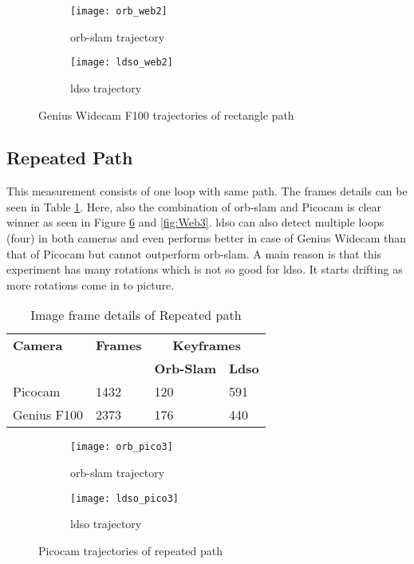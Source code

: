 \begin{figure}[H]
	\begin{subfigure}{.6\textwidth}
		\centering
		\texttt{[image: orb\_web2]}
		\caption{\acrshort{orb}-\acrshort{slam} trajectory}
		\label{fig:orb_web2}
	\end{subfigure}%
	\begin{subfigure}{.4\textwidth}
		\centering
		\texttt{[image: ldso\_web2]}
		\caption{\acrshort{ldso} trajectory}
		\label{fig:ldso_web2}
	\end{subfigure}
	\caption{Genius Widecam F100 trajectories of rectangle path}
	\label{fig:Web2}
\end{figure}

\subsection{Repeated Path}
This measurement consists of one loop with same path. The frames details can be seen in Table \ref{table:repeated}. Here, also the combination of \acrshort{orb}-\acrshort{slam} and Picocam is clear winner as seen in Figure \ref{fig:Pico3} and \ref{fig:Web3}. \acrshort{ldso} can also detect multiple loops (four) in both cameras and even performs better in case of Genius Widecam than that of Picocam but cannot outperform \acrshort{orb}-\acrshort{slam}. A main reason is that this experiment has many rotations which is not so good for \acrshort{ldso}. It starts drifting as more rotations come in to picture.\\
\begin{table}[H]
	\centering
	\renewcommand{\arraystretch}{1.5}
	\begin{tabular}{ l| l| l |l }
		\textbf{Camera} & \textbf{Frames} & \multicolumn{2}{c}{\textbf{Keyframes}}  \\    
		&      & \textbf{Orb-Slam}  & \textbf{Ldso}  \\
		\hline
		Picocam & 1432 &  120  & 591 \\ 
		\hline
		Genius F100 & 2373 &  176  & 440 \\ 
	\end{tabular}
	\caption{Image frame details of Repeated path}
	\label{table:repeated}
\end{table}
\begin{figure}[H]
	\begin{subfigure}{.5\textwidth}
		\centering
		\texttt{[image: orb\_pico3]}
		\caption{\acrshort{orb}-\acrshort{slam} trajectory}
		\label{fig:orb_pico3}
	\end{subfigure}
	\begin{subfigure}{.5\textwidth}
		\centering
		\texttt{[image: ldso\_pico3]}
		\caption{\acrshort{ldso} trajectory}
		\label{fig:ldso_pico3}
	\end{subfigure}
	\caption{Picocam trajectories of repeated path}
	\label{fig:Pico3}
\end{figure}
